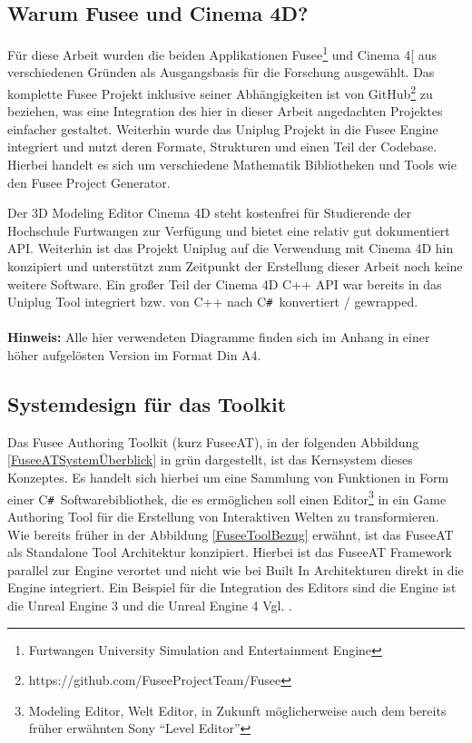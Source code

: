\documentclass[pagesize, paper=a4, fontsize=12pt, titlepage=true, headings=small, headnosepline, abstractoff, liststotoc, nochapterprefix, plainheadsepline, twoside]{scrreprt}
\newcommand{\CSS}{C\texttt{\# }}
\begin{document}
\subsection{Warum Fusee und Cinema 4D?}
Für diese Arbeit wurden die beiden Applikationen Fusee\footnote{Furtwangen University Simulation and Entertainment Engine} und Cinema 4[\autocite{MaxonC4d2014} aus verschiedenen Gründen als Ausgangsbasis für die Forschung ausgewählt. Das komplette Fusee Projekt inklusive seiner Abhängigkeiten ist von GitHub\footnote{https://github.com/FuseeProjectTeam/Fusee} zu beziehen, was eine Integration des hier in dieser Arbeit angedachten Projektes einfacher gestaltet. Weiterhin wurde das Uniplug Projekt in die Fusee Engine integriert und nutzt deren Formate, Strukturen und einen Teil der Codebase. Hierbei handelt es sich um verschiedene Mathematik Bibliotheken und Tools wie den Fusee Project Generator.

Der 3D Modeling Editor Cinema 4D steht kostenfrei für Studierende der Hochschule Furtwangen zur Verfügung und bietet eine relativ gut dokumentiert API. Weiterhin ist das Projekt Uniplug auf die Verwendung mit Cinema 4D hin konzipiert und unterstützt zum Zeitpunkt der Erstellung dieser Arbeit noch keine weitere Software. Ein großer Teil der Cinema 4D C++ API war bereits in das Uniplug Tool integriert bzw. von C++ nach \CSS konvertiert / gewrapped.
\\
\\
\textbf{Hinweis:} Alle hier verwendeten Diagramme finden sich im Anhang in einer höher aufgelösten Version im Format Din A4.

\subsection{Systemdesign für das Toolkit}
Das Fusee Authoring Toolkit (kurz FuseeAT), in der folgenden Abbildung \ref{FuseeATSystemÜberblick} in grün dargestellt, ist das Kernsystem dieses Konzeptes. Es handelt sich hierbei um eine Sammlung von Funktionen in Form einer \CSS Softwarebibliothek, die es ermöglichen soll einen Editor\footnote{Modeling Editor, Welt Editor, in Zukunft  möglicherweise auch dem bereits früher erwähnten Sony “Level Editor”} in ein Game Authoring Tool für die Erstellung von Interaktiven Welten zu transformieren. Wie bereits früher in der Abbildung \ref{FuseeToolBezug} erwähnt, ist das FuseeAT als Standalone Tool Architektur konzipiert. Hierbei ist das FuseeAT Framework parallel zur Engine verortet und nicht wie bei Built In Architekturen direkt in die Engine integriert. Ein Beispiel für die Integration des Editors sind die Engine ist die Unreal Engine 3 und die Unreal Engine 4 Vgl. \parencite[S. 54-55]{Gregory2009}.
\end{document}
